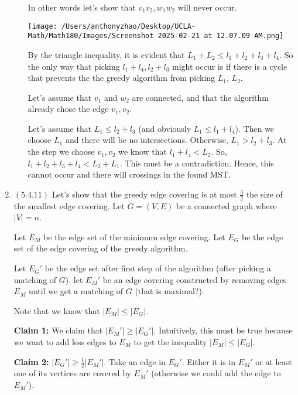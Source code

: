 \documentclass[12pt]{article}
\begin{document}
\begin{enumerate}[start=1,label={\bfseries Problem \arabic*:},leftmargin=1in]
\begin{enumerate}
        In other words let's show that $v_{1} v_{2}, w_{1} w_{2}$ will never occur. 

        \texttt{[image: /Users/anthonyzhao/Desktop/UCLA-Math/Math180/Images/Screenshot 2025-02-21 at 12.07.09 AM.png]}
    
        By the triangle inequality, it is evident that $L_{1} + L_{2} \leq l_{1} + l_{2} + l_{3} + l_{4}$. So the only way that picking $l_{1}+l_{4}, l_{2} + l_{3}$ might occur is if there is a cycle 
        that prevents the the greedy algorithm from picking $L_{1}$, $L_{2}$.  

        Let's assume that $v_{1}$ and $w_{2}$ are connected, and that the algorithm already chose the edge $v_{1}, v_{2}$.

        Let's assume that $L_1 \leq l_2 + l_3$ (and obviously $L_1 \leq l_1 + l_4$). Then we choose $L_1$ and there will be no intersections. 
        Otherwise, $L_{1} > l_{2} + l_{3}$. At the step we choose $v_{1},v_{2}$ we know that $l_{1} + l_{4} < L_{2}$. So, $l_{1} + l_{2} + l_{3} + l_{4} < L_{2} + L_{1}$. This must be a contradiction. Hence, this cannot occur and there will crossings in the found MST.

    \end{enumerate}
   
    \item $(5.4.11)$
    Let's show that the greedy edge covering is at most $\frac{3}{2}$ the size of the smallest edge covering. 
    Let $G = (V, E)$ be a connected graph where $|V| = n$. 
    
    Let $E_{M}$ be the edge set of the minimum edge covering. Let $E_{G}$ be the edge set of the edge covering of the greedy algorithm. 
    
    Let $E_{G}'$ be the edge set after first step of the algorithm (after picking a matching of $G$). let $E_{M}'$ be an edge covering constructed by removing edges $E_{M}$ until we get a matching of $G$ (that is maximal?). 

    Note that we know that $|E_{M}| \leq |E_{G}|$. 

    \textbf{Claim 1:} We claim that $|E_{M}'| \geq |E_{G}'|$. Intuitively, this must be true because we want to add less edges to $E_{M}$ to get the inequality $|E_{M}| \leq |E_{G}|$. 
    
    \textbf{Claim 2:} $|E_{G}'| \geq \frac{1}{2}|E_{M}'|$. Take an edge in $E_{G}'$. Either it is in $E_{M}'$ or at least one of its vertices are covered by $E_{M}'$ (otherwise we could add the edge to $E_{M}'$). 


\end{enumerate}
\end{document}
